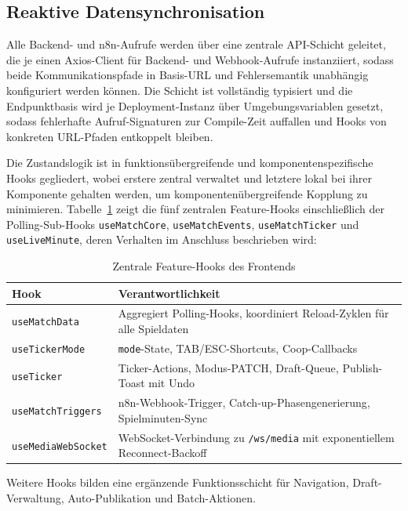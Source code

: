 \subsection{Reaktive Datensynchronisation}\label{hook-architektur}

Alle Backend- und n8n-Aufrufe werden über eine zentrale API-Schicht geleitet, die je einen Axios-Client für Backend- und Webhook-Aufrufe instanziiert, sodass beide Kommunikationspfade in Basis-URL und Fehlersemantik unabhängig konfiguriert werden können. Die Schicht ist vollständig typisiert und die Endpunktbasis wird je Deployment-Instanz über Umgebungsvariablen gesetzt, sodass fehlerhafte Aufruf-Signaturen zur Compile-Zeit auffallen und Hooks von konkreten URL-Pfaden entkoppelt bleiben.

Die Zustandslogik ist in funktionsübergreifende und komponentenspezifische Hooks gegliedert, wobei erstere zentral verwaltet und letztere lokal bei ihrer Komponente gehalten werden, um komponentenübergreifende Kopplung zu minimieren. Tabelle~\ref{tab:feature-hooks} zeigt die fünf zentralen Feature-Hooks einschließlich der Polling-Sub-Hooks \texttt{useMatchCore}, \texttt{useMatchEvents}, \texttt{useMatchTicker} und \texttt{useLiveMinute}, deren Verhalten im Anschluss beschrieben wird:

\begin{longtable}[]{@{}
  >{\raggedright\arraybackslash}p{}
  >{\raggedright\arraybackslash}p{}@{}}
\caption{Zentrale Feature-Hooks des Frontends}\label{tab:feature-hooks}\\
\toprule\noalign{}
Hook & Verantwortlichkeit \\
\midrule\noalign{}
\endhead
\bottomrule\noalign{}
\endlastfoot
\texttt{useMatchData} & Aggregiert Polling-Hooks, koordiniert Reload-Zyklen für alle Spieldaten \\
\texttt{useTickerMode} & \texttt{mode}-State, TAB/ESC-Shortcuts, Coop-Callbacks \\
\texttt{useTicker} & Ticker-Actions, Modus-PATCH, Draft-Queue, Publish-Toast mit Undo \\
\texttt{useMatchTriggers} & n8n-Webhook-Trigger, Catch-up-Phasengenerierung, Spielminuten-Sync \\
\texttt{useMediaWebSocket} & WebSocket-Verbindung zu \texttt{/ws/media} mit exponentiellem Reconnect-Backoff \\
\end{longtable}

Weitere Hooks bilden eine ergänzende Funktionsschicht für Navigation, Draft-Verwaltung, Auto-Publikation und Batch-Aktionen.

